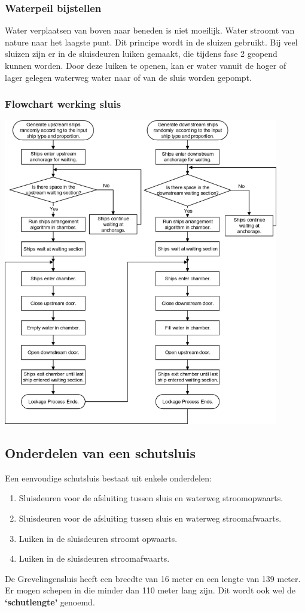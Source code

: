 \documentclass{article} %
\begin{document}
\subsubsection{Waterpeil bijstellen}
Water verplaatsen van boven naar beneden is niet moeilijk. Water stroomt van nature naar het laagste punt. Dit principe wordt in de sluizen gebruikt. Bij veel sluizen zijn er in de sluisdeuren luiken gemaakt, die tijdens fase 2 geopend kunnen worden. Door deze luiken te openen, kan er water vanuit de hoger of lager gelegen waterweg water naar of van de sluis worden gepompt. \par

\newpage
\subsubsection{Flowchart werking sluis}
\includegraphics[width=0.9\textwidth]{lockageprocess.png} \cite{flowchart1}
\newpage

\subsection{Onderdelen van een schutsluis}
Een eenvoudige schutsluis bestaat uit enkele onderdelen:
\begin{enumerate}
    \item Sluisdeuren voor de afsluiting tussen sluis en waterweg stroomopwaarts.
    \item Sluisdeuren voor de afsluiting tussen sluis en waterweg stroomafwaarts.
    \item Luiken in de sluisdeuren stroomt opwaarts.
    \item Luiken in de sluisdeuren stroomafwaarts.
\end{enumerate}
De Grevelingensluis heeft een breedte van 16 meter en een lengte van 139 meter. Er mogen schepen in die minder dan 110 meter lang zijn. Dit wordt ook wel de \textbf{‘schutlengte’} genoemd. \cite{WaterkaartGrevelingensluis}
\end{document}
